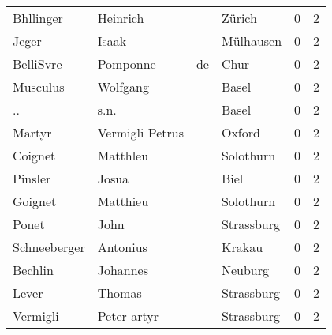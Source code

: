 \documentclass[10pt,a4paper,landscape]{article}
\begin{document}
\begin{longtable}{llllrr}
                Bhllinger &                           Heinrich &             &                                      Zürich &          0 &         2 \\
                    Jeger &                              Isaak &             &                                   Mülhausen &          0 &         2 \\
                BelliSvre &                           Pomponne &          de &                                        Chur &          0 &         2 \\
                 Musculus &                           Wolfgang &             &                                       Basel &          0 &         2 \\
                       .. &                               s.n. &             &                                       Basel &          0 &         2 \\
                   Martyr &                    Vermigli Petrus &             &                                      Oxford &          0 &         2 \\
                  Coignet &                           Matthleu &             &                                   Solothurn &          0 &         2 \\
                  Pinsler &                              Josua &             &                                        Biel &          0 &         2 \\
                  Goignet &                           Matthieu &             &                                   Solothurn &          0 &         2 \\
                    Ponet &                               John &             &                                  Strassburg &          0 &         2 \\
             Schneeberger &                           Antonius &             &                                      Krakau &          0 &         2 \\
                  Bechlin &                           Johannes &             &                                     Neuburg &          0 &         2 \\
                    Lever &                             Thomas &             &                                  Strassburg &          0 &         2 \\
                 Vermigli &                        Peter artyr &             &                                  Strassburg &          0 &         2 \\

\end{longtable}
\end{document}
